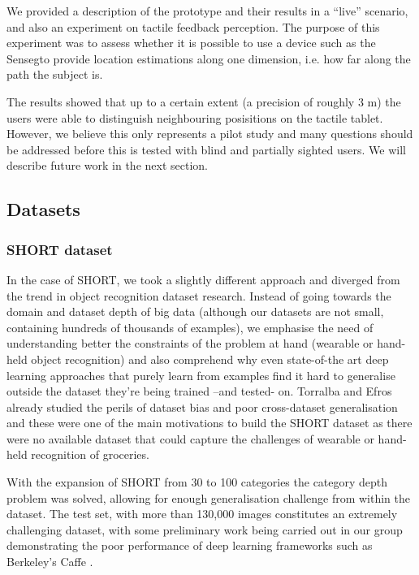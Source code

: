 We provided a description of the prototype and their results in a ``live'' scenario, and also an experiment on tactile feedback perception. The purpose of this experiment was to assess whether it is possible to use a device such as the Senseg\texttrademark to provide location estimations along one dimension, i.e. how far along the path the subject is. 

The results showed that up to a certain extent (a precision of roughly 3 m) the users were able to distinguish neighbouring posisitions on the tactile tablet. However, we believe this only represents a pilot study and many questions should be addressed before this is tested with blind and partially sighted users. We will describe future work in the next section.

\subsection{Datasets}

\subsubsection{SHORT dataset}

In the case of SHORT, we took a slightly different approach and diverged from the trend in object recognition dataset research. Instead of going towards the domain and dataset depth of big data (although our datasets are not small, containing hundreds of thousands of examples), we emphasise the need of understanding better the constraints of the problem at hand (wearable or hand-held object recognition) and also comprehend why even state-of-the art deep learning approaches that purely learn from examples find it hard to generalise outside the dataset they're being trained --and tested- on. Torralba and Efros already studied the perils of dataset bias and poor cross-dataset generalisation \cite{torralba2011unbiased} and these were one of the main motivations to build the SHORT dataset as there were no available dataset that could capture the challenges of wearable or hand-held recognition of groceries.

With the expansion of SHORT from 30 to 100 categories the category depth problem was solved, allowing for enough generalisation challenge from within the dataset. The test set, with more than	 130,000 images constitutes an extremely challenging dataset, with some preliminary work  being carried out in our group demonstrating the poor performance of deep learning frameworks such as Berkeley's Caffe \cite{jia2014caffe}.

